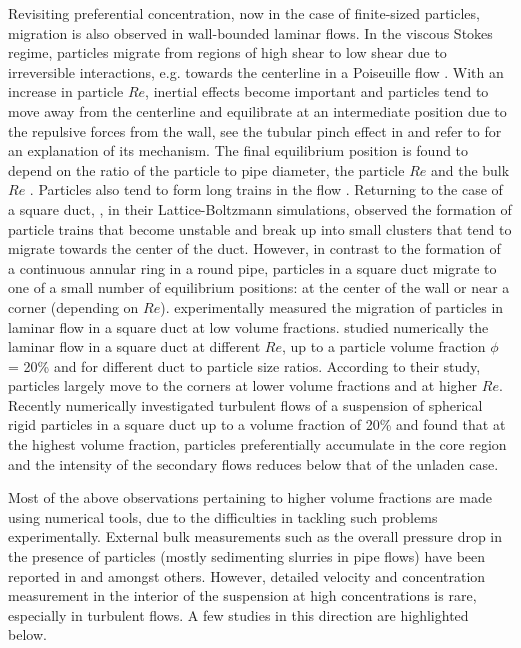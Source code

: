 \documentclass{jfm}
\begin{document}
Revisiting preferential concentration, now in the case of finite-sized particles, migration is also observed in wall-bounded laminar flows. In the viscous Stokes regime, particles migrate from regions of high shear to low shear due to irreversible interactions, e.g. towards the centerline in a Poiseuille flow \citep{guazzelli2011physical}. With an increase in particle $Re$, inertial effects become important and particles tend to move away from the centerline and equilibrate at an intermediate position due to the repulsive forces from the wall, see the tubular pinch effect in \citet{segre1962behaviour} and refer to \citet{ho1974inertial} for an explanation of its mechanism. The final equilibrium position is found to depend on the ratio of the particle to pipe diameter, the particle $Re$ and the bulk $Re$ \citep{matas2004inertial}. Particles also tend to form long trains in the flow \citep{matas2004trains}. Returning to the case of a square duct, \citet{chun2006inertial}, in their Lattice-Boltzmann simulations, observed the formation of particle trains that become unstable and break up into small clusters that tend to migrate towards the center of the duct. However, in contrast to the formation of a continuous annular ring in a round pipe, particles in a square duct migrate to one of a small number of equilibrium positions: at the center of the wall or near a corner (depending on $Re$). 
 \citet{choi2011lateral,abbas2014migration,miura2014inertial} experimentally measured the migration of particles in laminar flow in a square duct at low volume fractions. 
 \citet{Hamid2017Laminar} studied numerically the laminar flow in a square duct at different $Re$, up to a particle volume fraction $\phi$ = 20\% and for different duct to particle size ratios.  According to their study, particles largely move to the corners at lower volume fractions and at higher $Re$. 
Recently \citet{fornari2017suspensions} numerically investigated turbulent flows of a suspension of spherical rigid particles in a square duct up to a volume fraction of 20\% and found that at the highest volume fraction, particles preferentially accumulate in the core region and the intensity of the secondary flows reduces below that of the unladen case.

Most of the above observations pertaining to higher volume fractions are made using numerical tools, due to the difficulties in tackling such problems experimentally. 
External bulk measurements such as the overall pressure drop in the presence of particles (mostly sedimenting slurries in pipe flows) have been reported in \cite{doron1987slurry} and \cite{kaushal2002solids} amongst others. However, detailed velocity and concentration measurement in the interior of the suspension at high concentrations is rare, especially in turbulent flows. A few studies in this direction are highlighted below.
\end{document}

